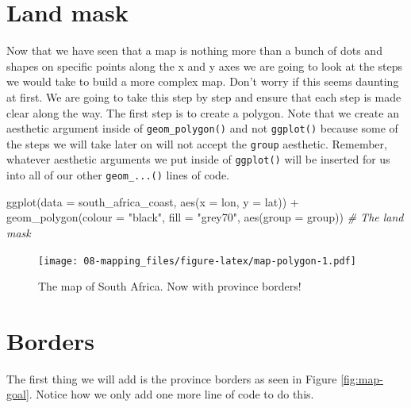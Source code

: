 \documentclass[
]{book}
\newenvironment{Shaded}{\begin{snugshade}}{\end{snugshade}}
\newcommand{\AttributeTok}[1]{\textcolor[rgb]{0.77,0.63,0.00}{#1}}
\newcommand{\CommentTok}[1]{\textcolor[rgb]{0.56,0.35,0.01}{\textit{#1}}}
\newcommand{\FunctionTok}[1]{\textcolor[rgb]{0.00,0.00,0.00}{#1}}
\newcommand{\NormalTok}[1]{#1}
\newcommand{\SpecialCharTok}[1]{\textcolor[rgb]{0.00,0.00,0.00}{#1}}
\newcommand{\StringTok}[1]{\textcolor[rgb]{0.31,0.60,0.02}{#1}}
\begin{document}
\hypertarget{land-mask}{%
\section{Land mask}\label{land-mask}}

Now that we have seen that a map is nothing more than a bunch of dots and shapes on specific points along the x and y axes we are going to look at the steps we would take to build a more complex map. Don't worry if this seems daunting at first. We are going to take this step by step and ensure that each step is made clear along the way. The first step is to create a polygon. Note that we create an aesthetic argument inside of \texttt{geom\_polygon()} and not \texttt{ggplot()} because some of the steps we will take later on will not accept the \texttt{group} aesthetic. Remember, whatever aesthetic arguments we put inside of \texttt{ggplot()} will be inserted for us into all of our other \texttt{geom\_...()} lines of code.

\begin{Shaded}
\begin{Highlighting}[]
\FunctionTok{ggplot}\NormalTok{(}\AttributeTok{data =}\NormalTok{ south\_africa\_coast, }\FunctionTok{aes}\NormalTok{(}\AttributeTok{x =}\NormalTok{ lon, }\AttributeTok{y =}\NormalTok{ lat)) }\SpecialCharTok{+}
  \FunctionTok{geom\_polygon}\NormalTok{(}\AttributeTok{colour =} \StringTok{"black"}\NormalTok{, }\AttributeTok{fill =} \StringTok{"grey70"}\NormalTok{, }\FunctionTok{aes}\NormalTok{(}\AttributeTok{group =}\NormalTok{ group)) }\CommentTok{\# The land mask}
\end{Highlighting}
\end{Shaded}

\begin{figure}
\centering
\texttt{[image: 08-mapping\_files/figure-latex/map-polygon-1.pdf]}
\caption{\label{fig:map-polygon}The map of South Africa. Now with province borders!}
\end{figure}

\hypertarget{borders}{%
\section{Borders}\label{borders}}

The first thing we will add is the province borders as seen in Figure \ref{fig:map-goal}. Notice how we only add one more line of code to do this.
\end{document}
